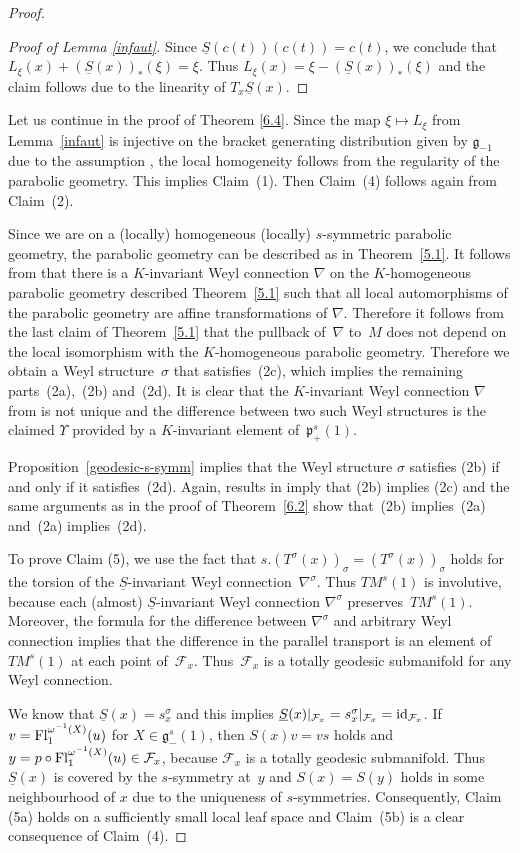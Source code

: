\documentclass[pdftex]{sigma}
\newcommand{\om}{\omega}
\newcommand{\si}{\sigma}
\newcommand{\un}{\underline}
\newcommand{\fg}{\mathfrak g}
\newcommand{\fp}{\mathfrak p}
\newcommand{\Fl}{{\rm Fl}}
\newcommand{\id}{{\rm id}}
\newcommand{\na}{\nabla}
\newcommand{\U}{\Upsilon}
\numberwithin{equation}{section}
\begin{document}
\begin{proof}
\begin{proof}[Proof of Lemma \ref{infaut}]
Since $\un S(c(t))(c(t))=c(t)$, we conclude that $L_\xi(x)+(\un S(x))_*(\xi)=\xi$. Thus $L_\xi(x)=\xi-(\un S(x))_*(\xi)$ and the claim follows due to the linearity of $T_x\un S(x)$.
\end{proof}

Let us continue in the proof of Theorem \ref{6.4}. Since the map $\xi \mapsto L_\xi$ from Lemma~\ref{infaut} is injective on the bracket generating distribution given by $\fg_{-1}$ due to the assumption \smash{$\fg_{-1}^s(1)=0$}, the local homogeneity follows from the regularity of the parabolic geometry. This implies Claim~(1). Then Claim~(4) follows again from Claim~(2).

Since we are on a (locally) homogeneous (locally) $s$-symmetric parabolic geometry, the parabolic geometry can be described as in Theorem~\ref{5.1}. It follows from \cite[Theorem~1.3]{GZ3} that there is a $K$-invariant Weyl connection $\nabla$ on the $K$-homogeneous parabolic geometry described Theorem~\ref{5.1} such that all local automorphisms of the parabolic geometry are af\/f\/ine transformations of $\nabla$. Therefore it follows from the last claim of Theorem~\ref{5.1} that the pullback of~$\nabla$ to~$M$ does not depend on the local isomorphism with the $K$-homogeneous parabolic geo\-met\-ry. Therefore we obtain a Weyl structure~$\si$ that satisf\/ies~(2c), which implies the remaining parts~(2a),~(2b) and~(2d). It is clear that the $K$-invariant Weyl connection $\nabla$ from \cite[Theorem~1.3]{GZ3} is not unique and the dif\/ference between two such Weyl structures is the claimed $\U$ provided by a $K$-invariant element of~$\fp_+^s(1)$.

Proposition~\ref{geodesic-s-symm} implies that the Weyl structure $\si$ satisf\/ies (2b) if and only if it satisf\/ies~(2d). Again, results in \cite[Theorem~1.3]{GZ3} imply that (2b) implies (2c) and the same arguments as in the proof of Theorem~\ref{6.2} show that~(2b) implies~(2a) and~(2a) implies~(2d).

To prove Claim (5), we use the fact that $s.(T^\si(x))_\si=(T^\si(x))_\si$ holds for the torsion of the $\un S$-invariant Weyl connection~$\na^\si$. Thus $TM^s(1)$ is involutive, because each (almost) $\un S$-invariant Weyl connection $\nabla^\si$ preserves~$TM^s(1)$. Moreover, the formula for the dif\/ference between $\nabla^\si$ and arbitrary Weyl connection implies that the dif\/ference in the parallel transport is an element of~$TM^s(1)$ at each point of~$\mathcal{F}_x$. Thus~$\mathcal{F}_x$ is a totally geodesic submanifold for any Weyl connection.

We know that $\un S(x)=s^{\si}_x$ and this implies $\un S(x)|_{\mathcal{F}_x}=s^{\si}_x|_{\mathcal{F}_x}=\id_{\mathcal{F}_x}$. If $v=\Fl_1^{\om^{-1}(X)}(u)$ for $X\in \fg_{-}^s(1)$, then $S(x)v=vs$ holds and $y=p\circ \Fl_1^{\om^{-1}(X)}(u)\in \mathcal{F}_x$, because $\mathcal{F}_x$ is a totally geodesic submanifold. Thus $\un S(x)$ is covered by the $s$-symmetry at~$y$ and $S(x)=S(y)$ holds in some neighbourhood of $x$ due to the uniqueness of $s$-symmetries. Consequently, Claim (5a) holds on a suf\/f\/iciently small local leaf space and Claim~(5b) is a clear consequence of Claim~(4).
\end{proof}
\end{document}
